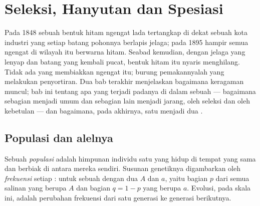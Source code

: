 \chapter{Seleksi, Hanyutan dan Spesiasi}\label{ch:g12:selection-drift-speciation}

Pada 1848 sebuah bentuk hitam ngengat lada tertangkap di dekat sebuah
kota industri yang setiap batang pohonnya berlapis jelaga; pada 1895
hampir semua ngengat di wilayah itu berwarna hitam. Seabad kemudian,
dengan jelaga yang lenyap dan batang yang kembali pucat, bentuk hitam
itu nyaris menghilang. Tidak ada yang membiakkan ngengat itu; burung
pemakannyalah yang melakukan penyortiran. Dua bab terakhir menjelaskan
bagaimana keragaman muncul; bab ini tentang apa yang terjadi padanya di
dalam sebuah  --- bagaimana sebagian  menjadi umum dan
sebagian lain menjadi jarang, oleh seleksi dan oleh kebetulan --- dan
bagaimana, pada akhirnya, satu  menjadi dua .

\section{Populasi dan alelnya}

\begin{definition}\label{def:g12:selection-drift-speciation:population}
Sebuah \emph{populasi} adalah himpunan individu satu
 yang hidup di tempat yang sama dan berbiak di antara mereka
sendiri. Susunan genetiknya digambarkan oleh
\emph{frekuensi}  setiap : untuk sebuah
 dengan dua  $A$ dan $a$, yaitu bagian $p$ dari semua salinan
yang berupa $A$ dan bagian $q = 1 - p$ yang berupa $a$. Evolusi, pada
skala ini, adalah perubahan frekuensi  dari satu generasi ke
generasi berikutnya.
\end{definition}

